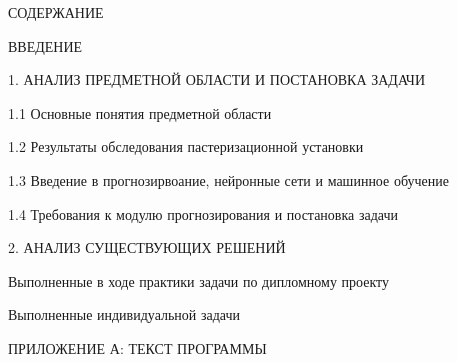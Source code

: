 {\gostTitleFont
    \redline
    СОДЕРЖАНИЕ
} 

\subtitlespace

{\gostFont

    \par ВВЕДЕНИЕ  
    \par 1. АНАЛИЗ ПРЕДМЕТНОЙ ОБЛАСТИ И ПОСТАНОВКА ЗАДАЧИ  
    \par 1.1 Основные понятия предметной области 
    \par 1.2 Результаты обследования пастеризационной установки  
    \par 1.3 Введение в прогнозирвоание, нейронные сети и машинное обучение  
    \par 1.4 Требования к модулю прогнозирования и постановка задачи  
    \par 2. АНАЛИЗ СУЩЕСТВУЮЩИХ РЕШЕНИЙ  
    \par Выполненные в ходе практики задачи по дипломному проекту  
    \par Выполненные индивидуальной задачи  
    \par ПРИЛОЖЕНИЕ А: ТЕКСТ ПРОГРАММЫ 
    \par 
}